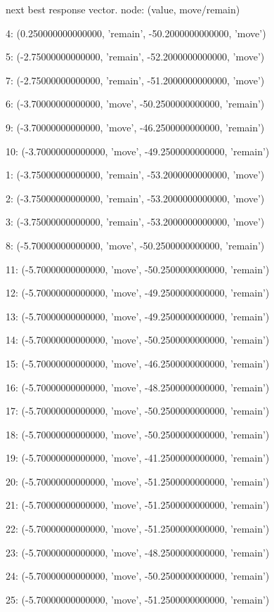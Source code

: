  next best response vector.  node: (value, move/remain)


4: (0.250000000000000, 'remain', -50.2000000000000, 'move')


5: (-2.75000000000000, 'remain', -52.2000000000000, 'move')


7: (-2.75000000000000, 'remain', -51.2000000000000, 'move')


6: (-3.70000000000000, 'move', -50.2500000000000, 'remain')


9: (-3.70000000000000, 'move', -46.2500000000000, 'remain')


10: (-3.70000000000000, 'move', -49.2500000000000, 'remain')


1: (-3.75000000000000, 'remain', -53.2000000000000, 'move')


2: (-3.75000000000000, 'remain', -53.2000000000000, 'move')


3: (-3.75000000000000, 'remain', -53.2000000000000, 'move')


8: (-5.70000000000000, 'move', -50.2500000000000, 'remain')


11: (-5.70000000000000, 'move', -50.2500000000000, 'remain')


12: (-5.70000000000000, 'move', -49.2500000000000, 'remain')


13: (-5.70000000000000, 'move', -49.2500000000000, 'remain')


14: (-5.70000000000000, 'move', -50.2500000000000, 'remain')


15: (-5.70000000000000, 'move', -46.2500000000000, 'remain')


16: (-5.70000000000000, 'move', -48.2500000000000, 'remain')


17: (-5.70000000000000, 'move', -50.2500000000000, 'remain')


18: (-5.70000000000000, 'move', -50.2500000000000, 'remain')


19: (-5.70000000000000, 'move', -41.2500000000000, 'remain')


20: (-5.70000000000000, 'move', -51.2500000000000, 'remain')


21: (-5.70000000000000, 'move', -51.2500000000000, 'remain')


22: (-5.70000000000000, 'move', -51.2500000000000, 'remain')


23: (-5.70000000000000, 'move', -48.2500000000000, 'remain')


24: (-5.70000000000000, 'move', -50.2500000000000, 'remain')


25: (-5.70000000000000, 'move', -51.2500000000000, 'remain')


